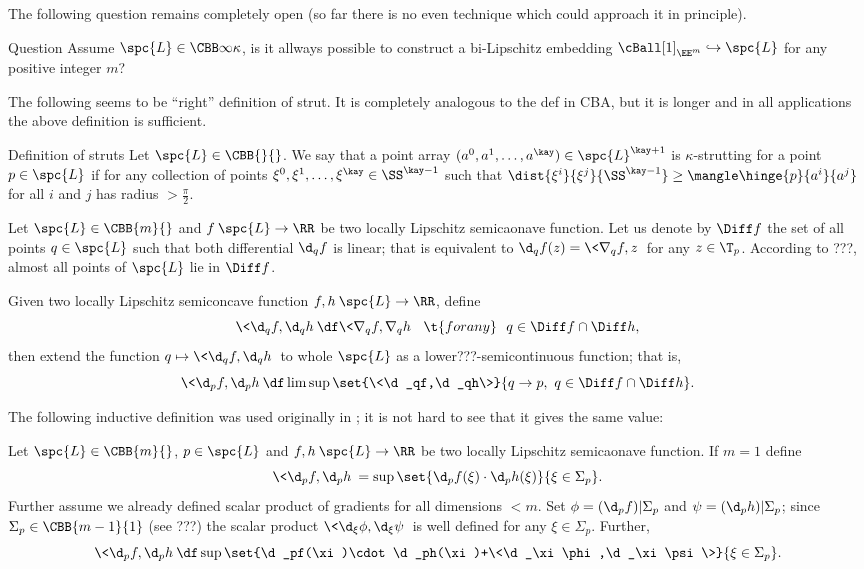 The following question remains completely open (so far there is no even technique which could approach it in principle).

\begin{thm}{Question}
Assume $\spc{L}\in\CBB\infty\kappa$, 
is it allways possible to construct a bi-Lipschitz embedding $\cBall[1]_{\EE^m}\hookrightarrow \spc{L}$ for any positive integer $m$?
\end{thm}

The following seems to be ``right'' definition of strut.
It is completely analogous to the def in CBA,
but it is  longer and in all applications the above definition is sufficient.%

\begin{thm}{Definition of struts}\label{def:strut-I+}
Let $\spc{L}\in\CBB{}{}$.
We say that a point array $(a^0,a^1,\dots,a^\kay)\in\spc{L}^{\kay+1}$
is $\kappa$-strutting for a point $p\in\spc{L}$ if 
for any collection of points $\xi^0,\xi^1,\dots,\xi^\kay\in \SS^{\kay-1}$
such that $\dist{\xi^i}{\xi^j}{\SS^{\kay-1}}\ge \mangle\hinge{p}{a^i}{a^j}$ for all $i$ and $j$ 
has radius $>\tfrac\pi2$.
\end{thm} 

Let 
$\spc{L}\in\CBB{m}{}$
and $f\:\spc{L}\to \RR$ be two locally Lipschitz semicaonave function.
Let us denote by $\Diff f$ the set of all points $q\in\spc{L}$ such that
both differential $\d_qf$ is linear;
that is equivalent to $\d_qf(z)=\<\nabla_qf,z\>$ for any $z\in\T_p$.
According to ???, almost all points of $\spc{L}$ lie in $\Diff f$.

Given two locally Lipschitz semiconcave function $f,h\:\spc{L}\to \RR$,
define 
\[
\<\d_qf,\d_qh\>
\df
\<\nabla_qf,\nabla_q h\>
\ \ \t{for any}\ \ 
q\in \Diff f\cap\Diff h,\]
then extend the function $q\mapsto \<\d_qf,\d_qh\>$ to whole $\spc{L}$ as a lower???-semicontinuous function;
that is,
\[
\<\d_pf,\d_ph\>
\df
\limsup\set{\<\d_qf,\d_qh\>}{q\to p,\ q\in \Diff f\cap \Diff h}.
\]

The following inductive definition was used originally in \cite[???]{perelman:DC}; 
it is not hard to see that it gives the same value:

Let $\spc{L}\in\CBB{m}{}$, 
$p\in\spc{L}$ 
and $f,h\:\spc{L}\to \RR$ be two locally Lipschitz semicaonave function.
If $m=1$ define 
\[
\<\d_p f,\d_ph\>
=
\sup\set{\d_pf(\xi)\cdot\d_ph(\xi)}{\xi\in\Sigma_p}.
\]
Further assume we already defined scalar product of gradients for all dimensions $<m$.
Set $\phi=(\d_pf)|\Sigma_p$ and $\psi=(\d_ph)|\Sigma_p$;
since $\Sigma_p\in\CBB{m-1}{1}$ (see ???) the scalar product
$\<\d_\xi\phi,\d_\xi\psi\>$ is well defined for any $\xi\in\Sigma_p$.
Further, 
\[
\<\d_pf,\d_ph\>
\df
\sup
\set{\d_pf(\xi)\cdot\d_ph(\xi)+\<\d_\xi\phi,\d_\xi\psi\>}%
{\xi\in\Sigma_p}.
\]


